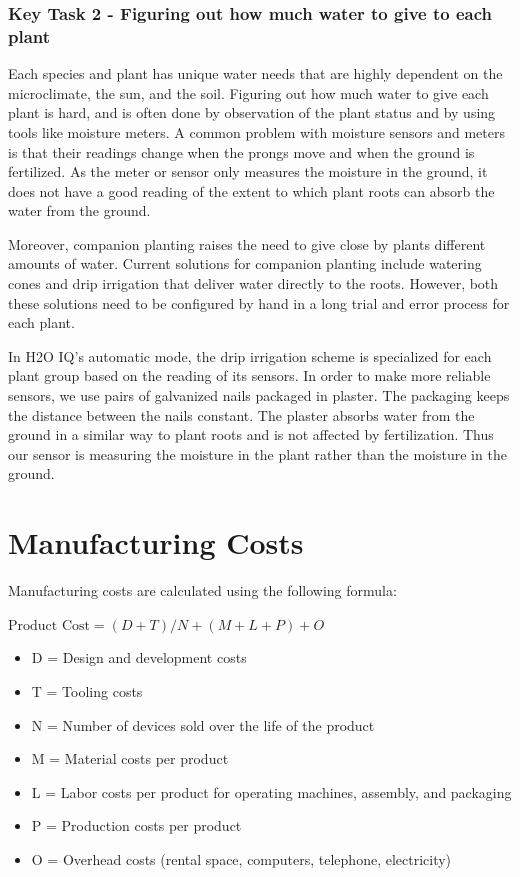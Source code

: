 \documentclass[11pt]{article}
\begin{document}
\subsubsection{Key Task 2 - Figuring out how much water to give to each plant}

Each species and plant has unique water needs that are highly dependent on the microclimate, the sun, and the soil. Figuring out how much water to give each plant is hard, and is often done by observation of the plant status and by using tools like moisture meters. A common problem with moisture sensors and meters is that their readings change when the prongs move and when the ground is fertilized. As the meter or sensor only measures the moisture in the ground, it does not have a good reading of the extent to which plant roots can absorb the water from the ground.

Moreover, companion planting raises the need to give close by plants different amounts of water. Current solutions for companion planting include watering cones and drip irrigation that deliver water directly to the roots. However, both these solutions need to be configured by hand in a long trial and error process for each plant.

In H2O IQ's automatic mode, the drip irrigation scheme is specialized for each plant group based on the reading of its sensors. In order to make more reliable sensors, we use pairs of galvanized nails packaged in plaster. The packaging keeps the distance between the nails constant. The plaster absorbs water from the ground in a similar way to plant roots and is not affected by fertilization. Thus our sensor is measuring the moisture in the plant rather than the moisture in the ground.

\section{Manufacturing Costs}

Manufacturing costs are calculated using the following formula:

$\textrm{Product Cost} = (D + T)/N + (M + L + P) + O$

\begin{itemize}
\item D = Design and development costs
\item T = Tooling costs
\item N = Number of devices sold over the life of the product
\item M = Material costs per product
\item L = Labor costs per product for operating machines, assembly, and packaging
\item P = Production costs per product
\item O = Overhead costs (rental space, computers, telephone, electricity)
\end{itemize} 
\end{document}
